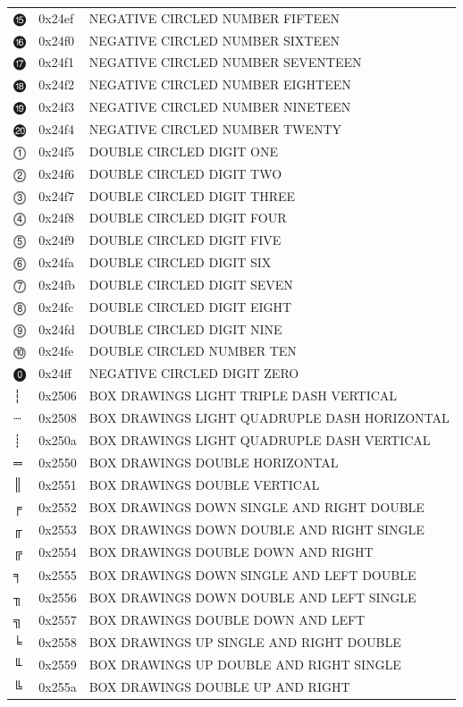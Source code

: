 \documentclass[12pt, twoside]{article}
\begin{document}
\begin{longtable}{L{1.0cm} L{2.0cm} >{\footnotesize}L{10cm}}
$⓯$&0x24ef&NEGATIVE CIRCLED NUMBER FIFTEEN\\
$⓰$&0x24f0&NEGATIVE CIRCLED NUMBER SIXTEEN\\
$⓱$&0x24f1&NEGATIVE CIRCLED NUMBER SEVENTEEN\\
$⓲$&0x24f2&NEGATIVE CIRCLED NUMBER EIGHTEEN\\
$⓳$&0x24f3&NEGATIVE CIRCLED NUMBER NINETEEN\\
$⓴$&0x24f4&NEGATIVE CIRCLED NUMBER TWENTY\\
$⓵$&0x24f5&DOUBLE CIRCLED DIGIT ONE\\
$⓶$&0x24f6&DOUBLE CIRCLED DIGIT TWO\\
$⓷$&0x24f7&DOUBLE CIRCLED DIGIT THREE\\
$⓸$&0x24f8&DOUBLE CIRCLED DIGIT FOUR\\
$⓹$&0x24f9&DOUBLE CIRCLED DIGIT FIVE\\
$⓺$&0x24fa&DOUBLE CIRCLED DIGIT SIX\\
$⓻$&0x24fb&DOUBLE CIRCLED DIGIT SEVEN\\
$⓼$&0x24fc&DOUBLE CIRCLED DIGIT EIGHT\\
$⓽$&0x24fd&DOUBLE CIRCLED DIGIT NINE\\
$⓾$&0x24fe&DOUBLE CIRCLED NUMBER TEN\\
$⓿$&0x24ff&NEGATIVE CIRCLED DIGIT ZERO\\
$┆$&0x2506&BOX DRAWINGS LIGHT TRIPLE DASH VERTICAL\\
$┈$&0x2508&BOX DRAWINGS LIGHT QUADRUPLE DASH HORIZONTAL\\
$┊$&0x250a&BOX DRAWINGS LIGHT QUADRUPLE DASH VERTICAL\\
$═$&0x2550&BOX DRAWINGS DOUBLE HORIZONTAL\\
$║$&0x2551&BOX DRAWINGS DOUBLE VERTICAL\\
$╒$&0x2552&BOX DRAWINGS DOWN SINGLE AND RIGHT DOUBLE\\
$╓$&0x2553&BOX DRAWINGS DOWN DOUBLE AND RIGHT SINGLE\\
$╔$&0x2554&BOX DRAWINGS DOUBLE DOWN AND RIGHT\\
$╕$&0x2555&BOX DRAWINGS DOWN SINGLE AND LEFT DOUBLE\\
$╖$&0x2556&BOX DRAWINGS DOWN DOUBLE AND LEFT SINGLE\\
$╗$&0x2557&BOX DRAWINGS DOUBLE DOWN AND LEFT\\
$╘$&0x2558&BOX DRAWINGS UP SINGLE AND RIGHT DOUBLE\\
$╙$&0x2559&BOX DRAWINGS UP DOUBLE AND RIGHT SINGLE\\
$╚$&0x255a&BOX DRAWINGS DOUBLE UP AND RIGHT\\

\end{longtable}
\end{document}
